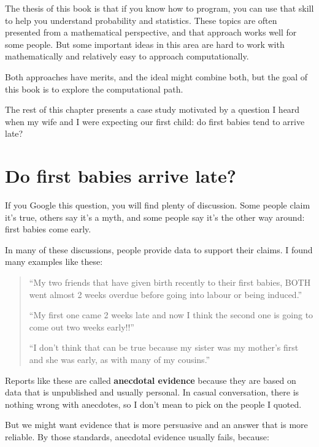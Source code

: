 \documentclass[10pt]{book}
\begin{document}
The thesis of this book is that if you know how to program, you can
use that skill to help you understand probability and statistics.
These topics are often presented from a mathematical perspective, and
that approach works well for some people.  But some important ideas
in this area are hard to work with mathematically and relatively
easy to approach computationally.

Both approaches have merits, and the ideal might combine both, but
the goal of this book is to explore the computational path.

The rest of this chapter presents a case study motivated by a question
I heard when my wife and I were expecting our first child: do first
babies tend to arrive late?

\section{Do first babies arrive late?}

If you Google this question, you will find plenty of discussion.
Some people claim it's true, others say it's a myth, and some people
say it's the other way around: first babies come early.

In many of these discussions, people provide data to support their
claims.  I found many examples like these:

\begin{quote}

``My two friends that have given birth recently to their first babies,
BOTH went almost 2 weeks overdue before going into labour or being
induced.''

``My first one came 2 weeks late and now I think the second one is
going to come out two weeks early!!''

``I don't think that can be true because my sister was my mother's
first and she was early, as with many of my cousins.''

\end{quote}

Reports like these are called {\bf anecdotal evidence} because they
are based on data that is unpublished and usually personal.  In casual
conversation, there is nothing wrong with anecdotes, so I don't mean
to pick on the people I quoted.

But we might want evidence that is more persuasive and
an answer that is more reliable.  By those standards, anecdotal
evidence usually fails, because:
\end{document}
